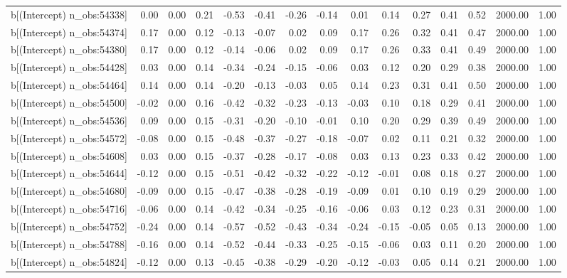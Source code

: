 \begin{table}[ht]
\begin{tabular}{rrrrrrrrrrrrrrr}
  b[(Intercept) n\_obs:54338] & 0.00 & 0.00 & 0.21 & -0.53 & -0.41 & -0.26 & -0.14 & 0.01 & 0.14 & 0.27 & 0.41 & 0.52 & 2000.00 & 1.00 \\ 
  b[(Intercept) n\_obs:54374] & 0.17 & 0.00 & 0.12 & -0.13 & -0.07 & 0.02 & 0.09 & 0.17 & 0.26 & 0.32 & 0.41 & 0.47 & 2000.00 & 1.00 \\ 
  b[(Intercept) n\_obs:54380] & 0.17 & 0.00 & 0.12 & -0.14 & -0.06 & 0.02 & 0.09 & 0.17 & 0.26 & 0.33 & 0.41 & 0.49 & 2000.00 & 1.00 \\ 
  b[(Intercept) n\_obs:54428] & 0.03 & 0.00 & 0.14 & -0.34 & -0.24 & -0.15 & -0.06 & 0.03 & 0.12 & 0.20 & 0.29 & 0.38 & 2000.00 & 1.00 \\ 
  b[(Intercept) n\_obs:54464] & 0.14 & 0.00 & 0.14 & -0.20 & -0.13 & -0.03 & 0.05 & 0.14 & 0.23 & 0.31 & 0.41 & 0.50 & 2000.00 & 1.00 \\ 
  b[(Intercept) n\_obs:54500] & -0.02 & 0.00 & 0.16 & -0.42 & -0.32 & -0.23 & -0.13 & -0.03 & 0.10 & 0.18 & 0.29 & 0.41 & 2000.00 & 1.00 \\ 
  b[(Intercept) n\_obs:54536] & 0.09 & 0.00 & 0.15 & -0.31 & -0.20 & -0.10 & -0.01 & 0.10 & 0.20 & 0.29 & 0.39 & 0.49 & 2000.00 & 1.00 \\ 
  b[(Intercept) n\_obs:54572] & -0.08 & 0.00 & 0.15 & -0.48 & -0.37 & -0.27 & -0.18 & -0.07 & 0.02 & 0.11 & 0.21 & 0.32 & 2000.00 & 1.00 \\ 
  b[(Intercept) n\_obs:54608] & 0.03 & 0.00 & 0.15 & -0.37 & -0.28 & -0.17 & -0.08 & 0.03 & 0.13 & 0.23 & 0.33 & 0.42 & 2000.00 & 1.00 \\ 
  b[(Intercept) n\_obs:54644] & -0.12 & 0.00 & 0.15 & -0.51 & -0.42 & -0.32 & -0.22 & -0.12 & -0.01 & 0.08 & 0.18 & 0.27 & 2000.00 & 1.00 \\ 
  b[(Intercept) n\_obs:54680] & -0.09 & 0.00 & 0.15 & -0.47 & -0.38 & -0.28 & -0.19 & -0.09 & 0.01 & 0.10 & 0.19 & 0.29 & 2000.00 & 1.00 \\ 
  b[(Intercept) n\_obs:54716] & -0.06 & 0.00 & 0.14 & -0.42 & -0.34 & -0.25 & -0.16 & -0.06 & 0.03 & 0.12 & 0.23 & 0.31 & 2000.00 & 1.00 \\ 
  b[(Intercept) n\_obs:54752] & -0.24 & 0.00 & 0.14 & -0.57 & -0.52 & -0.43 & -0.34 & -0.24 & -0.15 & -0.05 & 0.05 & 0.13 & 2000.00 & 1.00 \\ 
  b[(Intercept) n\_obs:54788] & -0.16 & 0.00 & 0.14 & -0.52 & -0.44 & -0.33 & -0.25 & -0.15 & -0.06 & 0.03 & 0.11 & 0.20 & 2000.00 & 1.00 \\ 
  b[(Intercept) n\_obs:54824] & -0.12 & 0.00 & 0.13 & -0.45 & -0.38 & -0.29 & -0.20 & -0.12 & -0.03 & 0.05 & 0.14 & 0.21 & 2000.00 & 1.00 \\ 

\end{tabular}
\end{table}
